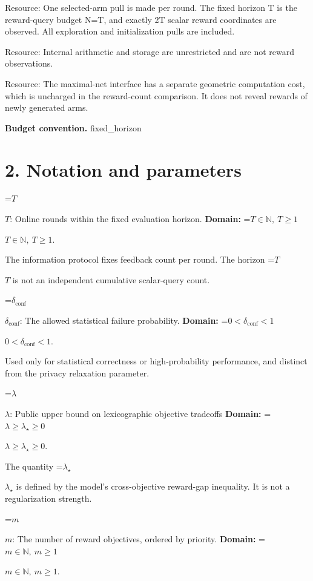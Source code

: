 \documentclass[10pt,a4paper]{article}
\newcommand{\AtlasMath}[1]{\par\begingroup\centering\setbox0=\hbox{$\displaystyle #1$}\ifdim\wd0>1.4\linewidth\typeout{ATLAS WIDE FORMULA: \the\wd0}\fi\ifdim\wd0>\linewidth\resizebox{\linewidth}{!}{\box0}\else\box0\fi\par\endgroup}
\newcommand{\AtlasInlineMath}[1]{\begingroup\setbox0=\hbox{$#1$}\ifdim\wd0>.4\linewidth\endgroup\AtlasMath{#1}\else\endgroup$#1$\fi}
\begin{document}
Resource: One selected-arm pull is made per round. The fixed horizon T is the reward-query budget N=T, and exactly 2T scalar reward coordinates are observed. All exploration and initialization pulls are included.



Resource: Internal arithmetic and storage are unrestricted and are not reward observations.



Resource: The maximal-net interface has a separate geometric computation cost, which is uncharged in the reward-count comparison. It does not reveal rewards of newly generated arms.



\textbf{Budget convention.} fixed\_horizon



\section{2. Notation and parameters}


\AtlasInlineMath{T}: Online rounds within the fixed evaluation horizon. \textbf{Domain:} \AtlasInlineMath{T\in\mathbb N,\ T\ge1}.



The information protocol fixes feedback count per round. The horizon \AtlasInlineMath{T} is not an independent cumulative scalar-query count.



\AtlasInlineMath{\delta_{\mathrm{conf}}}: The allowed statistical failure probability. \textbf{Domain:} \AtlasInlineMath{0<\delta_{\mathrm{conf}}<1}.



Used only for statistical correctness or high-probability performance, and distinct from the privacy relaxation parameter.



\AtlasInlineMath{\lambda}: Public upper bound on lexicographic objective tradeoffs \textbf{Domain:} \AtlasInlineMath{\lambda\ge\lambda_\star\ge0}.



The quantity \AtlasInlineMath{\lambda_\star} is defined by the model’s cross-objective reward-gap inequality. It is not a regularization strength.



\AtlasInlineMath{m}: The number of reward objectives, ordered by priority. \textbf{Domain:} \AtlasInlineMath{m\in\mathbb N,\ m\ge1}.
\end{document}
